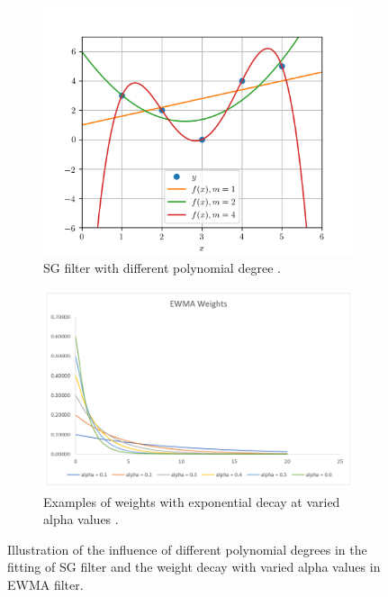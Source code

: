 \begin{figure}[!ht]
    \centering
    \begin{subfigure}[t]{0.7\textwidth}
      \includegraphics[width=\linewidth]{imgs/pre-processing/demo-polynomial-fitting.png}
      \caption{SG filter with different polynomial degree \citep{taalSmoothingYourData2017}.} \label{fig:filters-sg}
    \end{subfigure}%
    \hspace{2em}%
    \begin{subfigure}[t]{0.9\textwidth}
      \includegraphics[width=\linewidth]{imgs/pre-processing/demo-weight-ewma.png}
      \caption{Examples of weights with exponential decay at varied alpha values \citep{cfiExponentiallyWeightedMoving2022}.} \label{fig:filters-ewma}
    \end{subfigure}%
  \caption{Illustration of the influence of different polynomial degrees in the fitting of SG filter and the weight decay with varied alpha values in EWMA filter.} \label{fig:filters}
\end{figure}

